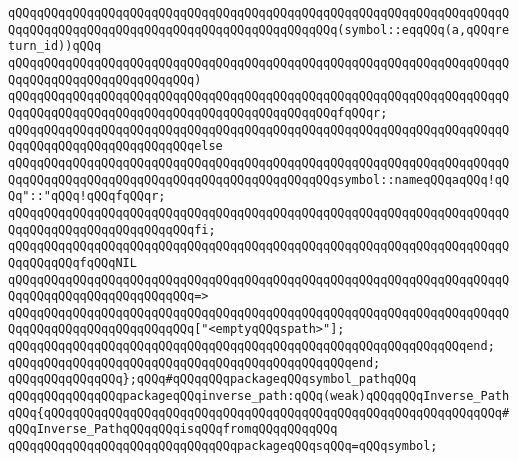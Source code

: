 \verb|qQQqqQQqqQQqqQQqqQQqqQQqqQQqqQQqqQQqqQQqqQQqqQQqqQQqqQQqqQQqqQQqqQQqqQQqqQQqqQQqqQQqqQQqqQQqqQQqqQQqqQQqqQQqqQQqqQQq(symbol::eqqQQq(a,qQQqreturn_id))qQQq|\newline
\verb|qQQqqQQqqQQqqQQqqQQqqQQqqQQqqQQqqQQqqQQqqQQqqQQqqQQqqQQqqQQqqQQqqQQqqQQqqQQqqQQqqQQqqQQqqQQqqQQq)|\newline
\verb|qQQqqQQqqQQqqQQqqQQqqQQqqQQqqQQqqQQqqQQqqQQqqQQqqQQqqQQqqQQqqQQqqQQqqQQqqQQqqQQqqQQqqQQqqQQqqQQqqQQqqQQqqQQqqQQqqQQqfqQQqr;|\newline
\verb|qQQqqQQqqQQqqQQqqQQqqQQqqQQqqQQqqQQqqQQqqQQqqQQqqQQqqQQqqQQqqQQqqQQqqQQqqQQqqQQqqQQqqQQqqQQqqQQqelse|\newline
\verb|qQQqqQQqqQQqqQQqqQQqqQQqqQQqqQQqqQQqqQQqqQQqqQQqqQQqqQQqqQQqqQQqqQQqqQQqqQQqqQQqqQQqqQQqqQQqqQQqqQQqqQQqqQQqqQQqqQQqsymbol::nameqQQqaqQQq!qQQq"::"qQQq!qQQqfqQQqr;|\newline
\verb|qQQqqQQqqQQqqQQqqQQqqQQqqQQqqQQqqQQqqQQqqQQqqQQqqQQqqQQqqQQqqQQqqQQqqQQqqQQqqQQqqQQqqQQqqQQqqQQqfi;|\newline
\newline
\verb|qQQqqQQqqQQqqQQqqQQqqQQqqQQqqQQqqQQqqQQqqQQqqQQqqQQqqQQqqQQqqQQqqQQqqQQqqQQqqQQqfqQQqNIL|\newline
\verb|qQQqqQQqqQQqqQQqqQQqqQQqqQQqqQQqqQQqqQQqqQQqqQQqqQQqqQQqqQQqqQQqqQQqqQQqqQQqqQQqqQQqqQQqqQQqqQQq=>|\newline
\verb|qQQqqQQqqQQqqQQqqQQqqQQqqQQqqQQqqQQqqQQqqQQqqQQqqQQqqQQqqQQqqQQqqQQqqQQqqQQqqQQqqQQqqQQqqQQqqQQq["<emptyqQQqspath>"];|\newline
\verb|qQQqqQQqqQQqqQQqqQQqqQQqqQQqqQQqqQQqqQQqqQQqqQQqqQQqqQQqqQQqqQQqend;|\newline
\verb|qQQqqQQqqQQqqQQqqQQqqQQqqQQqqQQqqQQqqQQqqQQqqQQqend;|\newline
\newline
\verb|qQQqqQQqqQQqqQQq};qQQq#qQQqqQQqpackageqQQqsymbol_pathqQQq|\newline
\newline
\newline
\verb|qQQqqQQqqQQqqQQqpackageqQQqinverse_path:qQQq(weak)qQQqqQQqInverse_PathqQQq{qQQqqQQqqQQqqQQqqQQqqQQqqQQqqQQqqQQqqQQqqQQqqQQqqQQqqQQqqQQqqQQq#qQQqInverse_PathqQQqqQQqisqQQqfromqQQqqQQqqQQq|\newline
\newline
\verb|qQQqqQQqqQQqqQQqqQQqqQQqqQQqqQQqpackageqQQqsqQQq=qQQqsymbol;|\newline
